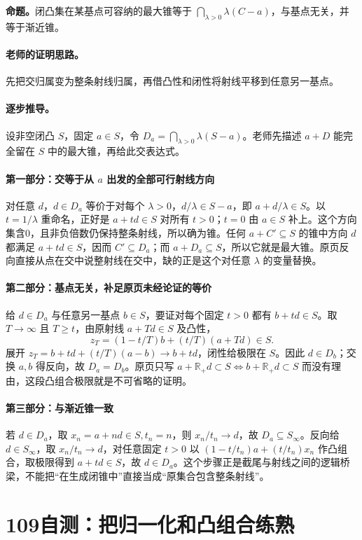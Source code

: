 \documentclass[11pt,a4paper]{article}
\newcommand{\R}{\mathbb{R}}\newcommand{\N}{\mathbb{N}}
\theoremstyle{definition}\newtheorem{definition}{定义}\newtheorem{example}{例}
\begin{document}
\textbf{命题。}闭凸集在某基点可容纳的最大锥等于 $\bigcap_{\lambda>0}\lambda(C-a)$，与基点无关，并等于渐近锥。

\paragraph{老师的证明思路。}先把交归属变为整条射线归属，再借凸性和闭性将射线平移到任意另一基点。

\paragraph{逐步推导。}
设非空闭凸 $S$，固定 $a\in S$，令 $D_a=\bigcap_{\lambda>0}\lambda(S-a)$。老师先描述 $a+D$ 能完全留在 $S$ 中的最大锥，再给此交表达式。
\paragraph{第一部分：交等于从 $a$ 出发的全部可行射线方向}
对任意 $d$，$d\in D_a$ 等价于对每个 $\lambda>0$，$d/\lambda\in S-a$，即 $a+d/\lambda\in S$。以 $t=1/\lambda$ 重命名，正好是 $a+td\in S$ 对所有 $t>0$；$t=0$ 由 $a\in S$ 补上。这个方向集含0，且非负倍数仍保持整条射线，所以确为锥。任何 $a+C'\subseteq S$ 的锥中方向 $d$ 都满足 $a+td\in S$，因而 $C'\subseteq D_a$；而 $a+D_a\subseteq S$，所以它就是最大锥。原页反向直接从点在交中说整射线在交中，缺的正是这个对任意 $\lambda$ 的变量替换。
\paragraph{第二部分：基点无关，补足原页未经论证的等价}
给 $d\in D_a$ 与任意另一基点 $b\in S$，要证对每个固定 $t>0$ 都有 $b+td\in S$。取 $T\to\infty$ 且 $T\ge t$，由原射线 $a+Td\in S$ 及凸性，
\[z_T=(1-t/T)b+(t/T)(a+Td)\in S.\]
展开 $z_T=b+td+(t/T)(a-b)\to b+td$，闭性给极限在 $S$。因此 $d\in D_b$；交换 $a,b$ 得反向，故 $D_a=D_b$。原页只写 $a+\R_+d\subset S\iff b+\R_+d\subset S$ 而没有理由，这段凸组合极限就是不可省略的证明。
\paragraph{第三部分：与渐近锥一致}
若 $d\in D_a$，取 $x_n=a+nd\in S,t_n=n$，则 $x_n/t_n\to d$，故 $D_a\subseteq S_\infty$。反向给 $d\in S_\infty$，取 $x_n/t_n\to d$，对任意固定 $t>0$ 以 $(1-t/t_n)a+(t/t_n)x_n$ 作凸组合，取极限得到 $a+td\in S$，故 $d\in D_a$。这个步骤正是截尾与射线之间的逻辑桥梁，不能把“在生成闭锥中”直接当成“原集合包含整条射线”。


\clearpage\section{109自测：把归一化和凸组合练熟}
\end{document}

